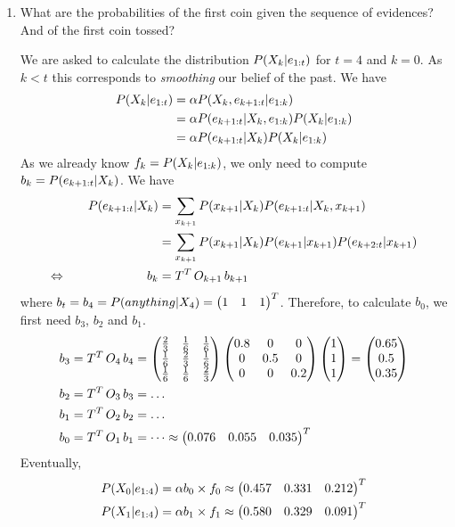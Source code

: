 \documentclass[11pt, a4paper]{article}
\begin{document}
\begin{enumerate}
    \item What are the probabilities of the first coin given the sequence of evidences? And of the first coin tossed?

    \begin{solution}
        We are asked to calculate the distribution $P(X_k \vert e_{1:t})$ for $t = 4$ and $k = 0$. As $k < t$ this corresponds to \emph{smoothing} our belief of the past. We have
        \begin{align*}
            P(X_k \vert e_{1:t}) & = \alpha P(X_k, e_{k + 1:t} \vert e_{1:k}) \\
            & = \alpha P(e_{k + 1:t} \vert X_k, e_{1:k}) P(X_k \vert e_{1:k}) \\
            & = \alpha P(e_{k + 1:t} \vert X_k) P(X_k \vert e_{1:k})
        \end{align*}
        As we already know $f_k = P(X_k \vert e_{1:k})$, we only need to compute $b_k = P(e_{k + 1:t} \vert X_k)$. We have
        \begin{alignat*}{2}
            && P(e_{k + 1:t} \vert X_k) & = \sum_{x_{k + 1}} P(x_{k + 1} \vert X_k) P(e_{k + 1:t} \vert X_k, x_{k + 1}) \\
            &&& = \sum_{x_{k + 1}} P(x_{k + 1} \vert X_k) P(e_{k + 1} \vert x_{k + 1}) P(e_{k + 2:t} \vert x_{k + 1}) \\
            \Leftrightarrow \quad && b_k & = T^T \, O_{k + 1} \, b_{k + 1}
        \end{alignat*}
        where $b_t = b_4 = P(anything \vert X_4) = \begin{pmatrix}1 & 1 & 1\end{pmatrix}^T$. Therefore, to calculate $b_0$, we first need $b_3$, $b_2$ and $b_1$.
        \begin{align*}
            b_3 & = T^T \, O_{4} \, b_4 = \begin{pmatrix}
                \frac{2}{3} & \frac{1}{6} & \frac{1}{6} \\
                \frac{1}{6} & \frac{2}{3} & \frac{1}{6} \\
                \frac{1}{6} & \frac{1}{6} & \frac{2}{3}
            \end{pmatrix} \begin{pmatrix}0.8 & 0 & 0 \\ 0 & 0.5 & 0 \\ 0 & 0 & 0.2\end{pmatrix} \begin{pmatrix}1 \\ 1 \\ 1\end{pmatrix} = \begin{pmatrix}0.65 \\ 0.5 \\ 0.35\end{pmatrix} \\
            b_2 & = T^T \, O_{3} \, b_3 = \dots \\
            b_1 & = T^T \, O_{2} \, b_2 = \dots \\
            b_0 & = T^T \, O_{1} \, b_1 = \dots \approx \begin{pmatrix}0.076 & 0.055 & 0.035\end{pmatrix}^T
        \end{align*}
        Eventually,
        \begin{align*}
            P(X_0 \vert e_{1:4}) & = \alpha b_0 \times f_0 \approx \begin{pmatrix}0.457 & 0.331 & 0.212\end{pmatrix}^T \\
            P(X_1 \vert e_{1:4}) & = \alpha b_1 \times f_1 \approx \begin{pmatrix}0.580 & 0.329 & 0.091\end{pmatrix}^T
        \end{align*}
    \end{solution}


\end{enumerate}
\end{document}
